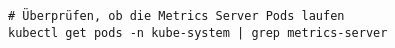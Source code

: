 \begin{verbatim}
# Überprüfen, ob die Metrics Server Pods laufen
kubectl get pods -n kube-system | grep metrics-server
\end{verbatim}